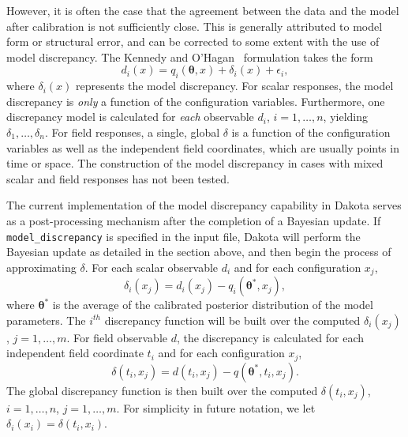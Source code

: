 However, it is often the case that the agreement between the 
data and the model after calibration is not sufficiently close. This is 
generally attributed to model form or structural error, and can be corrected 
to some extent with the use of model discrepancy. The Kennedy and 
O'Hagan~\cite{Kenn01} formulation takes the form
\begin{equation}
d_i(x) = q_i\left(\boldsymbol{\theta}, x\right) + \delta_i(x) + \epsilon_i,
\end{equation} 
where $\delta_i(x)$ represents the model discrepancy. For scalar responses, the
model discrepancy is \textit{only} a function of the configuration variables.
Furthermore, one discrepancy model is calculated for \textit{each} observable
$d_i$, $i = 1, \ldots, n$, yielding $\delta_1, \ldots, \delta_n$. For field
responses, a single, global $\delta$ is a function of the configuration 
variables as well as the independent field coordinates, which are usually 
points in time or space. The construction of the model discrepancy in cases 
with mixed scalar and field responses has not been tested.

The current implementation of the model discrepancy capability in Dakota 
serves as a post-processing mechanism after the completion of a Bayesian update.
If \texttt{model\_discrepancy} is specified in the input file, Dakota will 
perform the Bayesian update as detailed in the section above, and then begin 
the process of approximating $\delta$. For each scalar observable $d_i$ and for 
each configuration $x_j$,
\begin{equation}
\delta_i \left( x_j \right) = d_i \left( x_j \right) - 
q_i \left(\boldsymbol{\theta}^*, x_j \right),
\end{equation}
where $\boldsymbol{\theta}^*$ is the average of the calibrated posterior 
distribution of the model parameters. The $i^{th}$ discrepancy function
will be built over the computed $\delta_i \left( x_j \right)$, $j = 1, \ldots,
m$. For field observable $d$, the discrepancy is calculated for each
independent field coordinate $t_{i}$ and for each configuration $x_{j}$,
\begin{equation}
  \delta(t_{i}, x_{j}) = d(t_{i}, x_{j}) - q(\boldsymbol{\theta}^{*}, t_{i},
  x_{j}).
\end{equation}
The global discrepancy function is then built over the computed $\delta(t_{i},
x_{j})$, $i = 1, \ldots, n$, $j = 1, \ldots, m$. For simplicity in future
notation, we let $\delta_{i}(x_i) = \delta(t_i, x_i)$.

